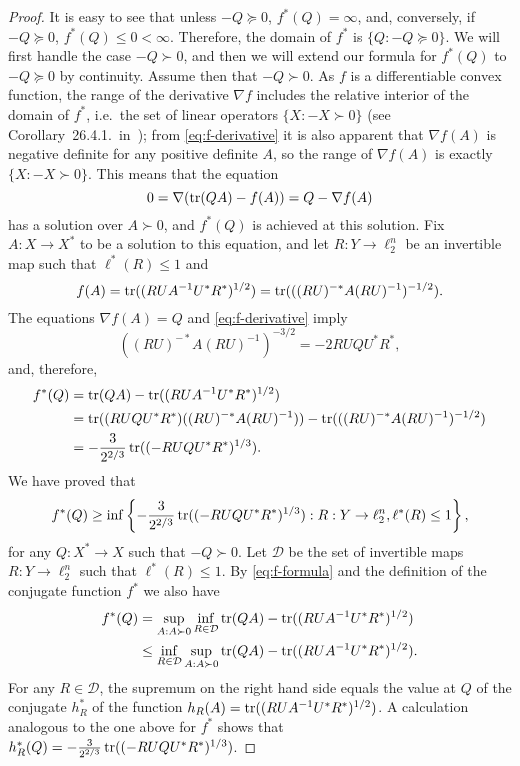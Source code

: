 \begin{proof}
  It is easy to see that unless $-Q \succeq 0$, $f^*(Q) = \infty$,
  and, conversely, if $-Q \succeq 0$, $f^*(Q) \le 0 <
  \infty$. Therefore, the domain of $f^*$ is $\{Q: -Q \succeq 0\}$. We
  will first handle the case $-Q \succ 0$, and then we will extend our
  formula for $f^*(Q)$ to $-Q \succeq 0$ by continuity. Assume then
  that $-Q \succ 0$. As $f$ is a differentiable convex function, the
  range of the derivative $\nabla f$ includes the relative
  interior of the domain of $f^*$, i.e.~the set of linear operators
  $\{X: -X \succ 0\}$ (see Corollary~26.4.1.~in~\cite{Rockafellar});
  from \eqref{eq:f-derivative} it is also apparent that $\nabla f(A)$
  is negative definite for any positive definite $A$, so the range of
  $\nabla f(A)$ is exactly $\{X: -X \succ 0\}$. This means that
  the equation 
  \[
  0 = \nabla(\operatorname{tr}(QA) - f(A)) = Q - \nabla f(A)
  \]
  has a solution over $A \succ 0$, and $f^*(Q)$ is achieved at this
  solution. Fix $A:X \to X^*$ to be a solution to this equation, and
  let $R:Y \to \ell_2^n$ be an invertible map such that
  $\ell^*(R) \le 1$ and 
  \[
  f(A) = \operatorname{tr}((RUA^{-1}U^*R^*)^{1/2}) = \operatorname{tr}(((RU)^{-*}A(RU)^{-1})^{-1/2}).
  \]
  The equations $\nabla f(A) = Q$ and \eqref{eq:f-derivative} imply
  \[
  ((RU)^{-*} A (RU)^{-1})^{-3/2} = -2 RUQU^*R^*,
  \]
  and, therefore,
  \begin{align*}
    f^*(Q) &= \operatorname{tr}(QA) - \operatorname{tr}((RUA^{-1}U^*R^*)^{1/2})\\
    &= \operatorname{tr}((RUQU^*R^*)((RU)^{-*}A(RU)^{-1})) -   \operatorname{tr}(((RU)^{-*}A(RU)^{-1})^{-1/2})\\
    &= -\frac{3}{2^{2/3}} \operatorname{tr}((-RUQU^*R^*)^{1/3}).
  \end{align*}
  We have proved that
  \begin{equation}\label{eq:conjugate-lb}
  f^*(Q) \ge 
  \inf\left\{ -\frac{3}{2^{2/3}} \operatorname{tr}((-RUQU^*R^*)^{1/3}):
  R:Y \to \ell_2^n,\ell^*(R) \le 1\right\},
  \end{equation}
  for any $Q:X^*\to X$ such that $-Q \succ 0$.  Let $\mathcal{D}$ be
  the set of invertible maps $R:Y \to \ell_2^n$ such that $\ell^*(R)
  \le 1$. By \eqref{eq:f-formula} and the definition of the
  conjugate function $f^*$ we also have
  \begin{align*}
  f^*(Q) &= 
  \sup_{A: A \succ 0} 
  \inf_{R \in \mathcal{D}}
  \operatorname{tr}(QA) - \operatorname{tr}((RUA^{-1}U^*R^*)^{1/2})\\
  &\le
  \inf_{R \in \mathcal{D}}
  \sup_{A: A \succ 0} 
  \operatorname{tr}(QA) - \operatorname{tr}((RUA^{-1}U^*R^*)^{1/2}).
  \end{align*}
  For any $R \in \mathcal{D}$, the supremum on the right hand side
  equals the value at $Q$ of the conjugate $h^*_R$ of the function
  $h_R(A) = \operatorname{tr}((RUA^{-1}U^*R^*)^{1/2})$. A calculation analogous to
  the one above for $f^*$ shows that $h_R^*(Q) = -\frac{3}{2^{2/3}}
  \operatorname{tr}((-RUQU^*R^*)^{1/3})$. 


\end{proof}
